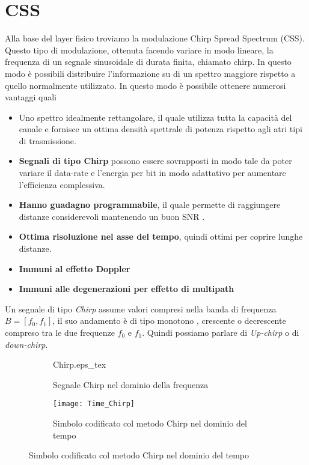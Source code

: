 \section{CSS}
Alla base del layer fisico troviamo la modulazione  Chirp Spread Spectrum (CSS). Questo tipo di
modulazione, ottenuta facendo variare in modo lineare, la frequenza di un segnale
sinusoidale di durata finita, chiamato chirp. In questo modo è possibili
distribuire l'informazione su di un spettro maggiore rispetto a quello
normalmente utilizzato.
In questo modo è possibile ottenere numerosi vantaggi quali
\begin{itemize}
\item Uno spettro idealmente rettangolare, il quale utilizza tutta la capacità
del canale e fornisce un ottima densità spettrale di potenza rispetto agli atri
tipi di trasmissione.
\item \textbf{Segnali di tipo Chirp} possono essere sovrapposti in modo tale da
poter variare il data-rate e l'energia per bit in modo adattativo per aumentare
l'efficienza complessiva.
\item \textbf{Hanno guadagno programmabile}, il quale permette di raggiungere
distanze considerevoli mantenendo un buon SNR .
\item  \textbf{Ottima risoluzione nel asse del tempo}, quindi ottimi per coprire
lunghe distanze.
\item \textbf{Immuni al effetto Doppler} 
\item \textbf{Immuni alle degenerazioni per effetto di multipath} 
\end{itemize}
Un segnale di tipo \emph{Chirp} assume valori compresi nella banda di frequenza
$B = [f_0,f_1]$, il suo andamento è di tipo monotono , crescente o decrescente
compreso tra le due frequenze $f_0$ e $f_1$. Quindi possiamo parlare di
\emph{Up-chirp} o di \emph{down-chirp}.

\begin{figure}
\begin{subfigure}[h]{\textwidth}
\centering
{Chirp.eps_tex}
\caption{Segnale Chirp nel dominio della frequenza}
\end{subfigure}

\begin{subfigure}[h]{\textwidth}
\centering
\texttt{[image: Time\_Chirp]}
\caption{Simbolo codificato col metodo Chirp nel dominio del tempo}
\end{subfigure}
\end{figure}

